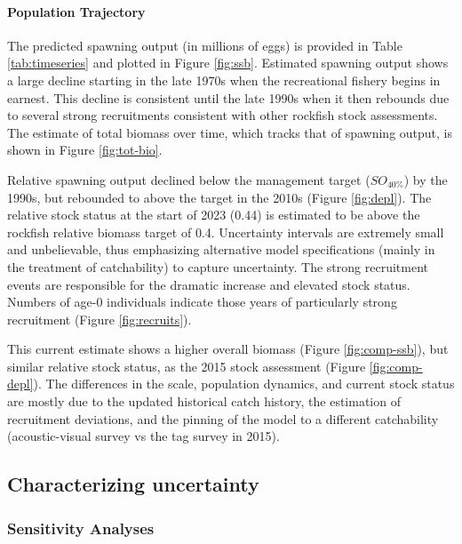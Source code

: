 \documentclass[11pt,
  english,
  letterpaper,
]{article}
\begin{document}
\hypertarget{population-trajectory}{%
\paragraph{Population Trajectory}\label{population-trajectory}}

The predicted spawning output (in millions of eggs) is provided in Table \ref{tab:timeseries} and plotted in Figure \ref{fig:ssb}. Estimated spawning output shows a large decline starting in the late 1970s when the recreational fishery begins in earnest. This decline is consistent until the late 1990s when it then rebounds due to several strong recruitments consistent with other rockfish stock assessments. The estimate of total biomass over time, which tracks that of spawning output, is shown in Figure \ref{fig:tot-bio}.

Relative spawning output declined below the management target (\(SO_{40\%}\)) by the 1990s, but rebounded to above the target in the 2010s (Figure \ref{fig:depl}). The relative stock status at the start of 2023 (0.44) is estimated to be above the rockfish relative biomass target of 0.4. Uncertainty intervals are extremely small and unbelievable, thus emphasizing alternative model specifications (mainly in the treatment of catchability) to capture uncertainty. The strong recruitment events are responsible for the dramatic increase and elevated stock status. Numbers of age-0 individuals indicate those years of particularly strong recruitment (Figure \ref{fig:recruits}).

This current estimate shows a higher overall biomass (Figure \ref{fig:comp-ssb}), but similar relative stock status, as the 2015 stock assessment (Figure \ref{fig:comp-depl}). The differences in the scale, population dynamics, and current stock status are mostly due to the updated historical catch history, the estimation of recruitment deviations, and the pinning of the model to a different catchability (acoustic-visual survey vs the tag survey in 2015).

\hypertarget{characterizing-uncertainty}{%
\subsection{Characterizing uncertainty}\label{characterizing-uncertainty}}

\hypertarget{sensitivity-analyses}{%
\subsubsection{Sensitivity Analyses}\label{sensitivity-analyses}}
\end{document}
